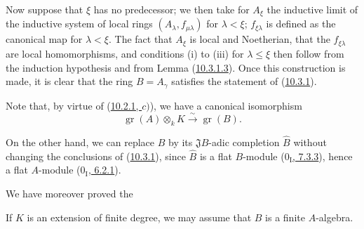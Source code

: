 \begin{env}[10.3.1.4]
Now suppose that $\xi$ has no predecessor; we then take
for $A_\xi$ the inductive limit of the inductive system of local rings
$(A_\lambda,f_{\mu\lambda})$ for $\lambda<\xi$; $f_{\xi\lambda}$ is defined
as the canonical map for $\lambda<\xi$. The fact that $A_\xi$ is
local and Noetherian, that the $f_{\xi\lambda}$ are local homomorphisms,
and conditions (i) to (iii) for $\lambda\leq\xi$
then follow from the induction hypothesis and from Lemma
(\hyperref[0.10.3.1.3]{10.3.1.3}). Once this construction is made, it is clear
that the ring $B=A_\gamma$ satisfies the statement of
(\hyperref[0.10.3.1]{10.3.1}).
\end{env}

Note that, by virtue of (\hyperref[0.10.2.1]{10.2.1, $c)$}), we have a
canonical isomorphism
\[
\label{0.10.3.1.5}
  \operatorname{gr}(A)\otimes_k K\xrightarrow{\sim}\operatorname{gr}(B).
  \tag{10.3.1.5}
\]

On the other hand, we can replace $B$ by its $\mathfrak J B$-adic completion
$\widehat B$ without changing the conclusions of
(\hyperref[0.10.3.1]{10.3.1}), since $\widehat B$ is a flat $B$-module
(\hyperref[0.7.3.3]{$0_{\mathrm I}$, 7.3.3}), hence a flat $A$-module
(\hyperref[0.6.2.1]{$0_{\mathrm I}$, 6.2.1}).

We have moreover proved the

\begin{corollary}[10.3.2]
\label{0.10.3.2}
If $K$ is an extension of finite degree, we may assume that $B$ is a
finite $A$-algebra.
\end{corollary}

